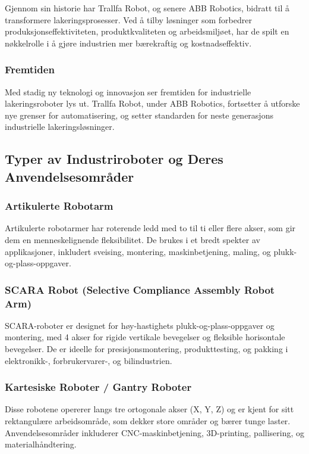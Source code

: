 Gjennom sin historie har Trallfa Robot, og senere ABB Robotics, bidratt til å transformere lakeringsprosesser. Ved å tilby løsninger som forbedrer produksjonseffektiviteten, produktkvaliteten og arbeidsmiljøet, har de spilt en nøkkelrolle i å gjøre industrien mer bærekraftig og kostnadseffektiv.

\subsubsection{Fremtiden}

Med stadig ny teknologi og innovasjon ser fremtiden for industrielle lakeringsroboter lys ut. Trallfa Robot, under ABB Robotics, fortsetter å utforske nye grenser for automatisering, og setter standarden for neste generasjons industrielle lakeringsløsninger.


\subsection{Typer av Industriroboter og Deres Anvendelsesområder}

\subsubsection{Artikulerte Robotarm}

Artikulerte robotarmer har roterende ledd med to til ti eller flere akser, som gir dem en menneskelignende fleksibilitet. De brukes i et bredt spekter av applikasjoner, inkludert sveising, montering, maskinbetjening, maling, og plukk-og-plass-oppgaver.

\subsubsection{SCARA Robot (Selective Compliance Assembly Robot Arm)}

SCARA-roboter er designet for høy-hastighets plukk-og-plass-oppgaver og montering, med 4 akser for rigide vertikale bevegelser og fleksible horisontale bevegelser. De er ideelle for presisjonsmontering, produkttesting, og pakking i elektronikk-, forbrukervarer-, og bilindustrien.

\subsubsection{Kartesiske Roboter / Gantry Roboter}

Disse robotene opererer langs tre ortogonale akser (X, Y, Z) og er kjent for sitt rektangulære arbeidsområde, som dekker store områder og bærer tunge laster. Anvendelsesområder inkluderer CNC-maskinbetjening, 3D-printing, pallisering, og materialhåndtering.

